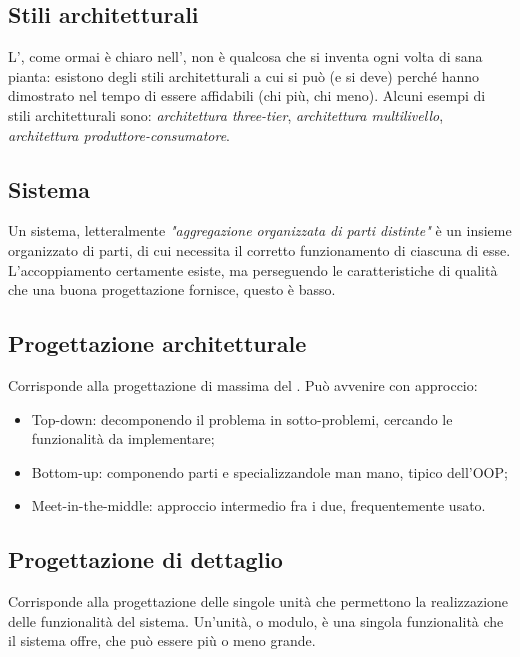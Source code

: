 \documentclass[../main]{subfiles}
\begin{document}
\subsection{Stili architetturali}
L', come ormai è chiaro nell', non è qualcosa che si inventa ogni volta di sana pianta: esistono degli stili architetturali a cui si può (e si deve) perché hanno dimostrato nel tempo di essere affidabili (chi più, chi meno).
Alcuni esempi di stili architetturali sono: \textit{architettura three-tier}, \textit{architettura multilivello}, \textit{architettura produttore-consumatore}.
\subsection{Sistema}
Un sistema, letteralmente \textit{"aggregazione organizzata di parti distinte"} è un insieme organizzato di parti, di cui necessita il corretto funzionamento di ciascuna di esse. L'accoppiamento certamente esiste, ma perseguendo le caratteristiche di qualità che una buona progettazione fornisce, questo è basso.
\subsection{Progettazione architetturale}
Corrisponde alla progettazione di massima del . Può avvenire con approccio:
\begin{itemize}
    \item Top-down: decomponendo il problema in sotto-problemi, cercando le funzionalità da implementare;
    \item Bottom-up: componendo parti e specializzandole man mano, tipico dell'OOP;
    \item Meet-in-the-middle: approccio intermedio fra i due, frequentemente usato.
\end{itemize}
\subsection{Progettazione di dettaglio}
Corrisponde alla progettazione delle singole unità che permettono la realizzazione delle funzionalità del sistema. Un'unità, o modulo, è una singola funzionalità che il sistema offre, che può essere più o meno grande.
\end{document}
